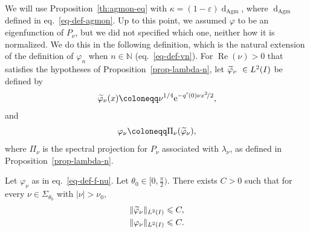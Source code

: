 \documentclass[AHL,Unicode,longabstracts,published]{cedram}
\renewcommand{\leq}{\leqslant}
\newcommand{\1}{\mathds 1}
\DeclareMathOperator{\Ree}{Re}
\newcommand{\dagmon}{\mathop{\mathrm{d}}\nolimits_{\mathrm{Agm}}}
\newcommand{\N}{\mathbb{N}}
\newcommand{\eu}{\mathrm e}
\newcommand{\sector}[1][\theta_0]{\Sigma_{#1}}
\newcommand{\e}{\varepsilon}
\newcommand{\f}{\varphi}
\let\oldtilde\tilde
\renewcommand*{\tilde}[1]{\mathchoice{\widetilde{#1}}{\widetilde{#1}}{\oldtilde{#1}}{\oldtilde{#1}}}
\DeclareMathOperator{\Ree}{Re}
\begin{document}
We will use Proposition~\ref{th:agmon-eq} with $\kappa = (1-\e)\dagmon$, where $\dagmon$ defined in eq.~\eqref{eq-def-agmon}. Up to this point, we assumed $\f$ to be an eigenfunction of $P_\nu$, but we did not specified which one, neither how it is normalized. We do this in the following definition, which is the natural extension of the definition of $\f_n$ when $n\in\N$ (eq.~\eqref{eq-def-vn}). For $\Ree(\nu)>0$ that satisfies the hypotheses of Proposition~\ref{prop-lambda-n}, let $\tilde \f_\nu\ \in L^2(I)$ be defined by
\begin{equation*}
\tilde \f_\nu(x) \coloneqq \nu^{1/4} \eu^{-q'(0) \nu x^2\!/2},
\end{equation*}
and
\begin{equation}\label{eq-def-f-nu}
\f_\nu \coloneqq \Pi_\nu(\tilde \f_\nu),
\end{equation}
where $\Pi_\nu$ is the spectral projection for $P_\nu$ associated with $\lambda_\nu$, as defined in Proposition~\ref{prop-lambda-n}.

\begin{prop}\label{th:est-vnu-l2}
Let $\f_\nu$ as in eq.~\eqref{eq-def-f-nu}. Let $\theta_0 \in \big[0,\frac \pi 2 \big)$. There exists $C >0$ such that for every $\nu \in \sector$ with $|\nu|>\nu_0$,
\begin{gather*}
\|\tilde \f_\nu\|_{L^2(I)} \leq C,\\
\|\f_\nu\|_{L^2(I)} \leq C.
\end{gather*}
\end{prop}
\end{document}

